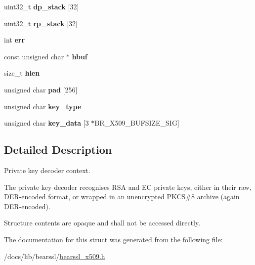 \begin{DoxyCompactItemize}
\begin{tabbing}
\end{tabbing}\item 
\mbox{\label{structbr__skey__decoder__context_a16ce6828031af8bc4fa7106e2bca3a01}} 
uint32\+\_\+t {\bfseries dp\+\_\+stack} \mbox{[}32\mbox{]}
\item 
\mbox{\label{structbr__skey__decoder__context_adf3911661e78273930063173137f5ff9}} 
uint32\+\_\+t {\bfseries rp\+\_\+stack} \mbox{[}32\mbox{]}
\item 
\mbox{\label{structbr__skey__decoder__context_ac5d5bc0d714e920d69238364e9f4d8c8}} 
int {\bfseries err}
\item 
\mbox{\label{structbr__skey__decoder__context_ab0c8dc56e4c498ca4fc58d2765fa35f9}} 
const unsigned char $\ast$ {\bfseries hbuf}
\item 
\mbox{\label{structbr__skey__decoder__context_a911c8e3d8ecad672e36ad15222e5e452}} 
size\+\_\+t {\bfseries hlen}
\item 
\mbox{\label{structbr__skey__decoder__context_a5ec264a8aa3f61c740b638322420c59f}} 
unsigned char {\bfseries pad} \mbox{[}256\mbox{]}
\item 
\mbox{\label{structbr__skey__decoder__context_aa7d7d44d50b9b44603917eec6c6335ef}} 
unsigned char {\bfseries key\+\_\+type}
\item 
\mbox{\label{structbr__skey__decoder__context_a39a49b8873e34364d113b9cea8fe863a}} 
unsigned char {\bfseries key\+\_\+data} \mbox{[}3 $\ast$B\+R\+\_\+\+X509\+\_\+\+B\+U\+F\+S\+I\+Z\+E\+\_\+\+S\+IG\mbox{]}
\end{DoxyCompactItemize}


\subsection{Detailed Description}
Private key decoder context. 

The private key decoder recognises R\+SA and EC private keys, either in their raw, D\+E\+R-\/encoded format, or wrapped in an unencrypted P\+K\+CS\#8 archive (again D\+E\+R-\/encoded).

Structure contents are opaque and shall not be accessed directly. 

The documentation for this struct was generated from the following file\+:\begin{DoxyCompactItemize}
\item 
/docs/lib/bearssl/\hyperlink{bearssl__x509_8h}{bearssl\+\_\+x509.\+h}\end{DoxyCompactItemize}

